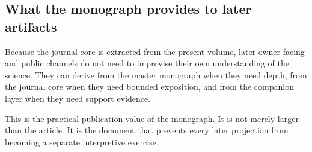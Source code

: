 \subsection{What the monograph provides to later artifacts}

Because the journal-core is extracted from the present volume, later owner-facing and public
channels do not need to improvise their own understanding of the science.
They can derive from the master monograph when they need depth, from the journal core when they
need bounded exposition, and from the companion layer when they need support evidence.

This is the practical publication value of the monograph.
It is not merely larger than the article.
It is the document that prevents every later projection from becoming a separate interpretive
exercise.

\clearpage
